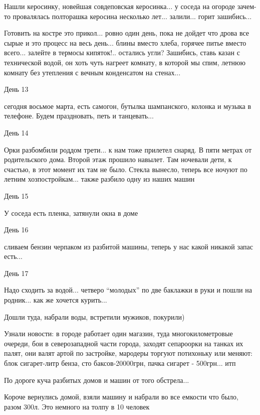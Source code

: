 Нашли керосинку, новейшая совдеповская керосинка... у соседа на огороде зачем-то
провалялась полторашка керосина несколько лет... залили... горит зашибись...

Готовить на костре это прикол... ровно один день, пока не дойдет что дрова все
сырые и это процесс на весь день... блины вместо хлеба, горячее питье вместо
всего... залейте в термосы кипяток!.. остались угли? Зашибись, ставь казан с
технической водой, он хоть чуть нагреет комнату, в которой мы спим, летнюю
комнату без утепления с вечным конденсатом на стенах...

День 13 

сегодня восьмое марта, есть самогон, бутылка шампанского, колонка и музыка в
телефоне. Будем праздновать, петь и танцевать...

День 14

Орки разбомбили роддом трети... к нам тоже прилетел снаряд. В пяти метрах от
родительского дома. Второй этаж прошило навылет. Там ночевали дети, к счастью,
в этот момент их там не было. Стекла вынесло, теперь все ночуют по летним
хозпостройкам... также разбило одну из наших машин


День 15 

У соседа есть пленка, затянули окна в доме

День 16 

сливаем бензин черпаком из разбитой машины, теперь у нас какой никакой запас есть...

День 17

Надо сходить за водой... четверо \enquote{молодых} по две баклажки в руки и
пошли на родник... как же хочется курить...

Дошли туда, набрали воды, встретили мужиков, покурили)

Узнали новости: в городе работает один магазин, туда многокилометровые очереди,
бои в северозападной части города, заходят сепароорки на танках их палят, они
валят артой по застройке, мародеры торгуют потихоньку или меняют: блок
сигарет-литр бенза, сто баксов-20000грн, пачка сигарет - 500грн... итп

По дороге куча разбитых домов и машин от того обстрела...

Короче вернулись домой, взяли машину и набрали во все емкости что было, разом
300л. Это немного на толпу в 10 человек

